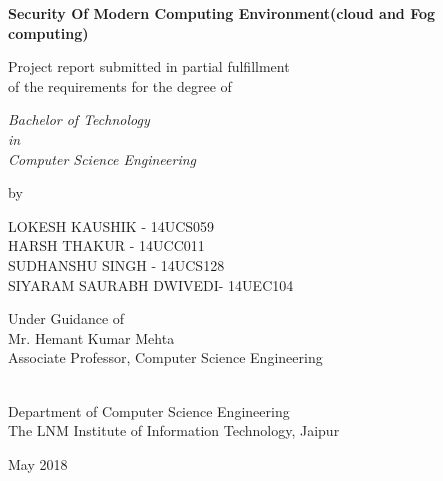 \thispagestyle{empty}
\begin{center}
{\Large \bf Security Of Modern Computing Environment(cloud and Fog computing)  }

\vspace*{1.75cm}
{\large Project report submitted in partial fulfillment\\}
{\large  of the requirements for the degree of \\}

\vspace*{1cm}
{\it {\large Bachelor of Technology} \\
{\large in\\}
{\large Computer Science Engineering  \\}}

\vspace*{1cm}
{\large by}

\vspace*{1cm}
{\large LOKESH KAUSHIK - 14UCS059\\}
{\large HARSH THAKUR - 14UCC011\\}
{\large SUDHANSHU SINGH - 14UCS128\\}
{\large  SIYARAM SAURABH DWIVEDI- 14UEC104\\}


\vspace*{5mm}
{\large Under Guidance of \\}
{\large Mr. Hemant Kumar Mehta \\}
{\large Associate Professor, Computer Science Engineering \\}

\vspace*{3.0cm}
{\\}
{\large Department of Computer Science Engineering \\}
{\large The LNM Institute of Information Technology, Jaipur\\}

\vspace*{1.0cm}
{\large May 2018\\}
\end{center}

